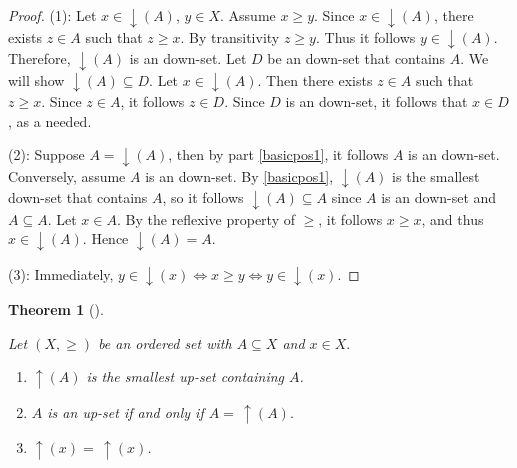 \documentclass[
  letterpaper,
  10pt,
  reqno,
  twopage,
  openany]{book}
\providecommand{\tightlist}{%
  \setlength{\itemsep}{0pt}\setlength{\parskip}{0pt}}\usepackage{longtable,booktabs,array}
\theoremstyle{plain}
\theoremstyle{definition}
\theoremstyle{definition}
\theoremstyle{definition}
\theoremstyle{plain}
\theoremstyle{plain}
\newtheorem{theorem}{Theorem}[chapter]
\theoremstyle{remark}
\begin{document}
\begin{proof}

(1): Let \(x\in {\downarrow}(A)\), \(y\in X.\) Assume \(x\geq y.\) Since
\(x\in {\downarrow}(A)\), there exists \(z\in A\) such that \(z\geq x.\)
By transitivity \(z\geq y.\) Thus it follows \(y\in {\downarrow}(A).\)
Therefore, \({\downarrow}(A)\) is an down-set. Let \(D\) be an down-set
that contains \(A.\) We will show \({\downarrow}(A)\subseteq D.\) Let
\(x\in {\downarrow}(A).\) Then there exists \(z\in A\) such that
\(z\geq x.\) Since \(z\in A\), it follows \(z\in D.\) Since \(D\) is an
down-set, it follows that \(x\in D\), as a needed.

(2): Suppose \(A={\downarrow}(A)\), then by part \eqref{basicpos1}, it
follows \(A\) is an down-set. Conversely, assume \(A\) is an down-set.
By \eqref{basicpos1}, \({\downarrow}(A)\) is the smallest down-set that
contains \(A\), so it follows \({\downarrow}(A)\subseteq A\) since \(A\)
is an down-set and \(A\subseteq A.\) Let \(x\in A.\) By the reflexive
property of \(\geq\), it follows \(x\geq x\), and thus
\(x\in {\downarrow}(A).\) Hence \({\downarrow}(A)=A.\)

(3): Immediately,
\(y\in {\downarrow}(x) \Longleftrightarrow x\geq y \Longleftrightarrow y\in {\downarrow}(x)\).

\end{proof}

\leavevmode{}%
\begin{theorem}[]\label{thm-smallest-up-set}

Let \((X,\geq)\) be an ordered set with \(A\subseteq X\) and \(x\in X.\)

\begin{enumerate}
\def\labelenumi{\arabic{enumi}.}
\tightlist
\item
  \({\uparrow}(A)\) is the smallest up-set containing \(A\).
\item
  \(A\) is an up-set if and only if \(A=\, {\uparrow}(A).\)
\item
  \({\uparrow}(x)=\, {\uparrow}(x)\).
\end{enumerate}

\end{theorem}
\end{document}
